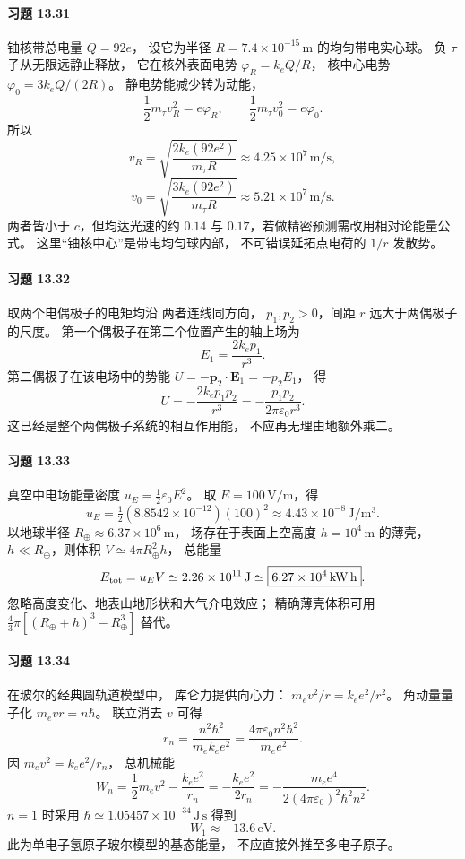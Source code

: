 \paragraph{习题 13.31}
铀核带总电量 \(Q=92e\)，
设它为半径 \(R=7.4\times10^{-15}\,\mathrm m\)
的均匀带电实心球。
负 \(\tau\) 子从无限远静止释放，
它在核外表面电势
\(\varphi_R=k_eQ/R\)，
核中心电势
\(\varphi_0=3k_eQ/(2R)\)。
静电势能减少转为动能，
\[
 \frac12m_\tau v_R^2=e\varphi_R,
 \qquad
 \frac12m_\tau v_0^2=e\varphi_0.
\]
所以
\[
 \boxed{v_R=\sqrt{\frac{2k_e(92e^2)}{m_\tau R}}
 \approx4.25\times10^7\,\mathrm{m/s}},
\]
\[
 \boxed{v_0=\sqrt{\frac{3k_e(92e^2)}{m_\tau R}}
 \approx5.21\times10^7\,\mathrm{m/s}}.
\]
两者皆小于 \(c\)，但均达光速的约
\(0.14\) 与 \(0.17\)，若做精密预测需改用相对论能量公式。
这里“铀核中心”是带电均匀球内部，
不可错误延拓点电荷的 \(1/r\) 发散势。

\paragraph{习题 13.32}
取两个电偶极子的电矩均沿
两者连线同方向，
\(p_1,p_2>0\)，间距 \(r\) 远大于两偶极子的尺度。
第一个偶极子在第二个位置产生的轴上场为
\[
 E_1=\frac{2k_ep_1}{r^3}.
\]
第二偶极子在该电场中的势能
\(U=-\boldsymbol p_2\cdot\boldsymbol E_1=-p_2E_1\)，
得
\[
 \boxed{U=-\frac{2k_ep_1p_2}{r^3}
 =-\frac{p_1p_2}{2\pi\varepsilon_0r^3}}.
\]
这已经是整个两偶极子系统的相互作用能，
不应再无理由地额外乘二。

\paragraph{习题 13.33}
真空中电场能量密度
\(u_E=\frac12\varepsilon_0E^2\)。
取 \(E=100\,\mathrm{V/m}\)，得
\[
 \boxed{u_E=\tfrac12(8.8542\times10^{-12})(100)^2
 \approx4.43\times10^{-8}\,\mathrm{J/m^3}}.
\]
以地球半径 \(R_\oplus\approx6.37\times10^6\,\mathrm m\)，
场存在于表面上空高度 \(h=10^4\,\mathrm m\) 的薄壳，
\(h\ll R_\oplus\)，则体积
\(V\simeq4\pi R_\oplus^2h\)，
总能量
\[
 E_{\rm tot}=u_EV\simeq2.26\times10^{11}\,\mathrm J
 \simeq\boxed{6.27\times10^4\,\mathrm{kW\,h}}.
\]
忽略高度变化、地表山地形状和大气介电效应；
精确薄壳体积可用
\(\frac43\pi[(R_\oplus+h)^3-R_\oplus^3]\) 替代。

\paragraph{习题 13.34}
在玻尔的经典圆轨道模型中，
库仑力提供向心力：
\(m_ev^2/r=k_ee^2/r^2\)。
角动量量子化
\(m_evr=n\hbar\)。
联立消去 \(v\) 可得
\[
 \boxed{r_n=\frac{n^2\hbar^2}{m_ek_ee^2}
 =\frac{4\pi\varepsilon_0 n^2\hbar^2}{m_ee^2}}.
\]
因 \(m_ev^2=k_ee^2/r_n\)，
总机械能
\[
 W_n=\frac12m_ev^2-\frac{k_ee^2}{r_n}
 =-\frac{k_ee^2}{2r_n}
 =\boxed{-\frac{m_ee^4}
 {2(4\pi\varepsilon_0)^2\hbar^2n^2}}.
\]
\(n=1\) 时采用 \(\hbar\simeq1.05457\times10^{-34}\,\mathrm{J\,s}\)
得到
\[
 \boxed{W_1\approx-13.6\,\mathrm{eV}}.
\]
此为单电子氢原子玻尔模型的基态能量，
不应直接外推至多电子原子。
